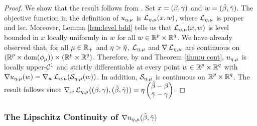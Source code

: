 \begin{proof} 
We show that the result follows from \cite[Theorem 10.58]{rockafellar2009variational}.
Set $x=\bg$ and $w=\tbg$. The objective function in the definition of
$\uemu$ is $\LL_\emu(x,w)$, where $\LL_\emu$  is proper and lsc.
Moreover, Lemma \ref{lem:level bdd} tells us that
$\LL_\emu(x,w)$ is level bounded in $x$ locally uniformly in $w$
for all $w\in \Rp\times\Rq$. We have already observed that, 
for all $\mu\in\R_+$ and $\eta>\blam$, $\LL_{\emu}$ and  $\nabla \LL_{\emu}$ 
are continuous
on $(\Rp\times\dom(\phimu))\times(\Rp\times\Rq)$.
Therefore, by \cite[Theorem 10.58]{rockafellar2009variational}
and Theorem \ref{thm:u cont}, $\uemu$ is locally upper-$\CC^1$
and strictly differentiable at every point $w\in\Rp\times\Rq$ with
$\nabla \uemu(w)=\nabla _w\LL_{\emu}(\SS_\emu(w))$.
In addition, $\SS_\emu$ is continuous on 
$\Rp\times\Rq$.
The result follows since $\nabla _w\LL_{\emu}(\bg,\tbg)
=\eta\begin{pmatrix}\tbeta-\beta\\ \tgam-\gam\end{pmatrix}
$.
\end{proof}

\subsubsection{The Lipschitz Continuity of $\nabla \uemu\tbg$}

